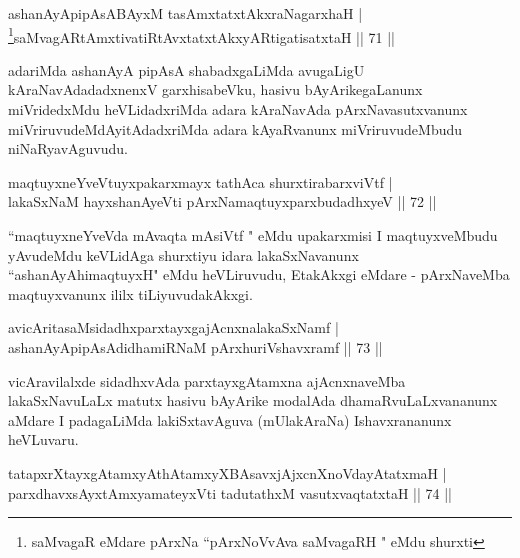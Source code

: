 \begin{shl}
ashanAyApipAsABAyxM tasAmxtatxtAkxraNagarxhaH |\\
\footnote{saMvagaR eMdare pArxNa ``pArxNoVvAva saMvagaRH " eMdu shurxti}saMvagARtAmxtivatiRtAvxtatxtAkxyARtigatisatxtaH \hfill || 71 ||
\end{shl}

\begin{artha}
adariMda ashanAyA pipAsA shabadxgaLiMda avugaLigU kAraNavAdadadxnenxV garxhisabeVku, hasivu bAyArikegaLanunx miVridedxMdu heVLidadxriMda adara kAraNavAda pArxNavasutxvanunx miVriruvudeMdAyitAdadxriMda adara kAyaRvanunx miVriruvudeMbudu niNaRyavAguvudu.
\end{artha}


\begin{shl}
maqtuyxneYveVtuyxpakarxmayx tathAca shurxtirabarxviVtf |\\
lakaSxNaM hayxshanAyeVti pArxNamaqtuyxparxbudadhxyeV \hfill || 72 ||
\end{shl}

\begin{artha}
``maqtuyxneYveVda mAvaqta mAsiVtf " eMdu upakarxmisi I maqtuyxveMbudu yAvudeMdu keVLidAga shurxtiyu idara lakaSxNavanunx ``ashanAyAhimaqtuyxH" eMdu heVLiruvudu, EtakAkxgi eMdare - pArxNaveMba maqtuyxvanunx ililx tiLiyuvudakAkxgi.
\end{artha}


\begin{shl}
avicAritasaMsidadhxparxtayxgajAcnxnalakaSxNamf |\\
ashanAyApipAsAdidhamiRNaM pArxhuriVshavxramf \hfill || 73 ||
\end{shl}

\begin{artha}
vicAravilalxde sidadhxvAda parxtayxgAtamxna ajAcnxnaveMba lakaSxNavuLaLx matutx hasivu bAyArike modalAda dhamaRvuLaLxvananunx aMdare I padagaLiMda lakiSxtavAguva (mUlakAraNa) Ishavxrananunx heVLuvaru.
\end{artha}

\begin{shl}
tatapxrXtayxgAtamxyAthAtamxyXBAsavxjAjxcnXnoVdayAtatxmaH |\\
parxdhavxsAyx\s \s tAmx\s yamateyxVti tadutathxM vasutxvaqtatxtaH \hfill || 74 ||
\end{shl}

